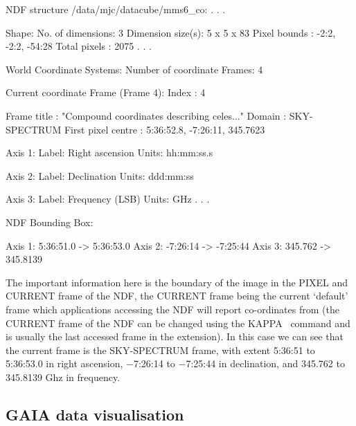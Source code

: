 \documentclass[twoside,11pt]{starlink}
\providecommand{\KAPPA}{{\footnotesize KAPPA}\normalsize}
\begin{document}
\begin{small}
\begin{terminalv}

NDF structure /data/mjc/datacube/mms6_co:
                 .
                 .
                 .

Shape:
  No. of dimensions:  3
  Dimension size(s):  5 x 5 x 83
  Pixel bounds     :  -2:2, -2:2, -54:28
  Total pixels     :  2075
                 .
                 .
                 .

World Coordinate Systems:
  Number of coordinate Frames: 4

  Current coordinate Frame (Frame 4):
    Index               : 4

    Frame title         : "Compound coordinates describing celes..."
    Domain              : SKY-SPECTRUM
    First pixel centre  : 5:36:52.8, -7:26:11, 345.7623

       Axis 1:
          Label: Right ascension
          Units: hh:mm:ss.s

       Axis 2:
          Label: Declination
          Units: ddd:mm:ss

       Axis 3:
          Label: Frequency (LSB)
          Units: GHz
                 .
                 .
                 .

    NDF Bounding Box:

       Axis 1: 5:36:51.0 -> 5:36:53.0
       Axis 2: -7:26:14 -> -7:25:44
       Axis 3: 345.762 -> 345.8139
\end{terminalv}
\end{small}

The important information here is the boundary of the image in the
PIXEL and CURRENT frame of the NDF, the CURRENT frame being the
current `default' frame which applications accessing the NDF will
report co-ordinates from (the CURRENT frame of the NDF can be changed
using the \KAPPA\  command and is
usually the last accessed frame in the extension).  In this case we can
see that the current frame is the SKY-SPECTRUM frame, with extent
5:36:51 to 5:36:53.0 in right ascension, $-$7:26:14 to $-$7:25:44 in
declination, and 345.762 to 345.8139 Ghz in frequency.


\newpage
\subsection{GAIA data visualisation\label{sc16_gaia}}
\end{document}
